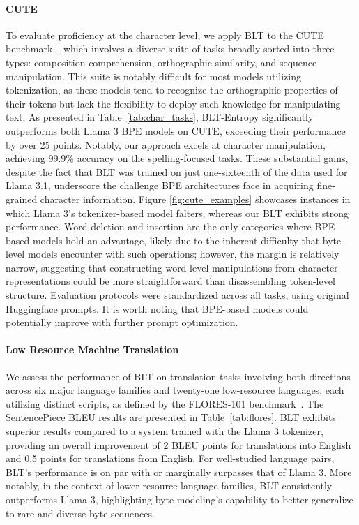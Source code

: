\paragraph{CUTE}
To evaluate proficiency at the character level, we apply {\textsc BLT} to the CUTE benchmark~\citep{edman2024cute}, which involves a diverse suite of tasks broadly sorted into three types: composition comprehension, orthographic similarity, and sequence manipulation. This suite is notably difficult for most models utilizing tokenization, as these models tend to recognize the orthographic properties of their tokens but lack the flexibility to deploy such knowledge for manipulating text. As presented in Table~\ref{tab:char_tasks}, {\textsc BLT}-Entropy significantly outperforms both Llama 3 BPE models on CUTE, exceeding their performance by over 25 points. Notably, our approach excels at character manipulation, achieving 99.9\% accuracy on the spelling-focused tasks. These substantial gains, despite the fact that {\textsc BLT} was trained on just one-sixteenth of the data used for Llama 3.1, underscore the challenge BPE architectures face in acquiring fine-grained character information. Figure \ref{fig:cute_examples} showcases instances in which Llama 3’s tokenizer-based model falters, whereas our {\textsc BLT} exhibits strong performance. Word deletion and insertion are the only categories where BPE-based models hold an advantage, likely due to the inherent difficulty that byte-level models encounter with such operations; however, the margin is relatively narrow, suggesting that constructing word-level manipulations from character representations could be more straightforward than disassembling token-level structure. Evaluation protocols were standardized across all tasks, using original Huggingface prompts. It is worth noting that BPE-based models could potentially improve with further prompt optimization.

\paragraph{Low Resource Machine Translation} We assess the performance of {\textsc BLT} on translation tasks involving both directions across six major language families and twenty-one low-resource languages, each utilizing distinct scripts, as defined by the FLORES-101 benchmark~\citep{goyal2022flores}. The SentencePiece BLEU results are presented in Table~\ref{tab:flores}. {\textsc BLT} exhibits superior results compared to a system trained with the Llama 3 tokenizer, providing an overall improvement of 2 BLEU points for translations into English and 0.5 points for translations from English. For well-studied language pairs, {\textsc BLT}'s performance is on par with or marginally surpasses that of Llama 3. More notably, in the context of lower-resource language families, {\textsc BLT} consistently outperforms Llama 3, highlighting byte modeling's capability to better generalize to rare and diverse byte sequences.

